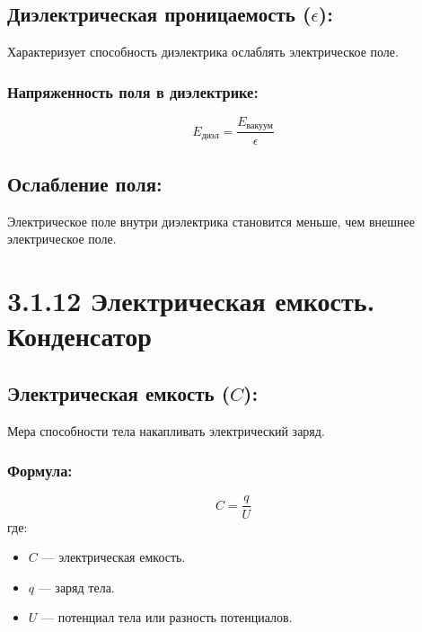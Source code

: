 \documentclass[a4paper,12pt]{article}
\begin{document}
\vspace{-9pt}
\subsection*{Диэлектрическая проницаемость ($\epsilon$):}
\vspace{-3pt}
Характеризует способность диэлектрика ослаблять электрическое поле.
\subsubsection*{Напряженность поля в диэлектрике:}
\vspace{-0.05em}
$$ E_{\text{диэл}} = \frac{E_{\text{вакуум}}}{\epsilon} $$

\vspace{-9pt}
\subsection*{Ослабление поля:}
\vspace{-3pt}
Электрическое поле внутри диэлектрика становится меньше, чем внешнее электрическое поле.
\newpage
\section*{3.1.12 Электрическая емкость. Конденсатор}
\vspace{-9pt}
\subsection*{Электрическая емкость ($C$):}
\vspace{-3pt}
Мера способности тела накапливать электрический заряд.

\vspace{-9pt}
\vspace{-3pt}
\subsubsection*{Формула:}
\vspace{-0.05em}
$$ C = \frac{q}{U} $$
где:
\begin{itemize}
    \item $C$ — электрическая емкость.
    \item $q$ — заряд тела.
    \item $U$ — потенциал тела или разность потенциалов.
\end{itemize}

\vspace{-9pt}
\end{document}
